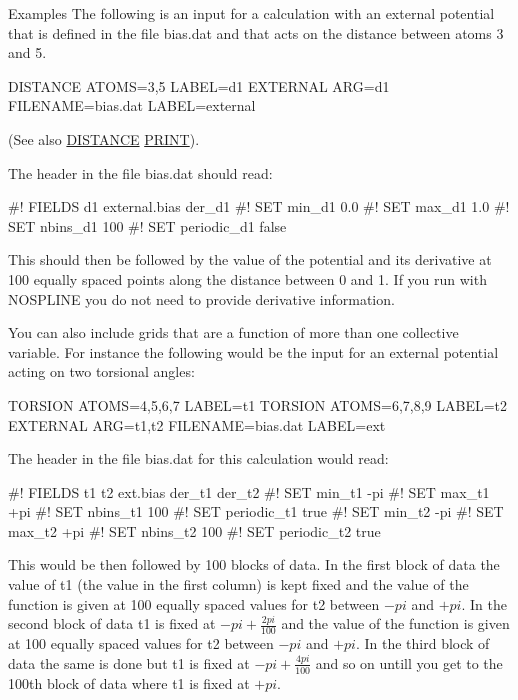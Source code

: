 \begin{DoxyParagraph}{Examples}
The following is an input for a calculation with an external potential that is defined in the file bias.\+dat and that acts on the distance between atoms 3 and 5. \begin{DoxyVerb}DISTANCE ATOMS=3,5 LABEL=d1
EXTERNAL ARG=d1 FILENAME=bias.dat LABEL=external 
\end{DoxyVerb}
 (See also \hyperlink{DISTANCE}{D\+I\+S\+T\+A\+N\+C\+E} \hyperlink{PRINT}{P\+R\+I\+N\+T}).
\end{DoxyParagraph}
The header in the file bias.\+dat should read\+: \begin{DoxyVerb}#! FIELDS d1 external.bias der_d1
#! SET min_d1 0.0
#! SET max_d1 1.0
#! SET nbins_d1 100
#! SET periodic_d1 false
\end{DoxyVerb}


This should then be followed by the value of the potential and its derivative at 100 equally spaced points along the distance between 0 and 1. If you run with N\+O\+S\+P\+L\+I\+N\+E you do not need to provide derivative information.

You can also include grids that are a function of more than one collective variable. For instance the following would be the input for an external potential acting on two torsional angles\+: \begin{DoxyVerb}TORSION ATOMS=4,5,6,7 LABEL=t1
TORSION ATOMS=6,7,8,9 LABEL=t2
EXTERNAL ARG=t1,t2 FILENAME=bias.dat LABEL=ext
\end{DoxyVerb}


The header in the file bias.\+dat for this calculation would read\+: \begin{DoxyVerb}#! FIELDS t1 t2 ext.bias der_t1 der_t2
#! SET min_t1 -pi
#! SET max_t1 +pi
#! SET nbins_t1 100
#! SET periodic_t1 true
#! SET min_t2 -pi
#! SET max_t2 +pi
#! SET nbins_t2 100
#! SET periodic_t2 true
\end{DoxyVerb}


This would be then followed by 100 blocks of data. In the first block of data the value of t1 (the value in the first column) is kept fixed and the value of the function is given at 100 equally spaced values for t2 between $-pi$ and $+pi$. In the second block of data t1 is fixed at $-pi + \frac{2pi}{100}$ and the value of the function is given at 100 equally spaced values for t2 between $-pi$ and $+pi$. In the third block of data the same is done but t1 is fixed at $-pi + \frac{4pi}{100}$ and so on untill you get to the 100th block of data where t1 is fixed at $+pi$.

